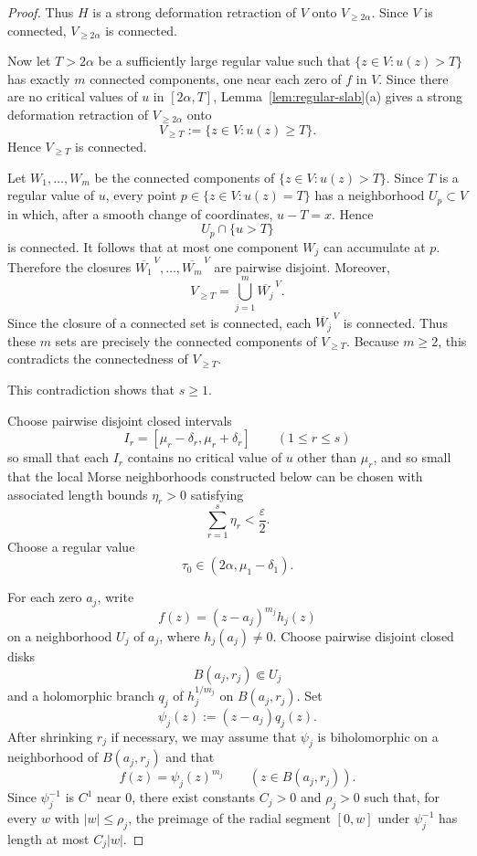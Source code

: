 \documentclass[12pt]{amsart}
\theoremstyle{definition}
\theoremstyle{remark}
\begin{document}
\begin{proof}
Thus $H$ is a strong deformation retraction of $V$ onto $V_{\ge 2\alpha}$. Since $V$ is
connected, $V_{\ge 2\alpha}$ is connected.

Now let $T>2\alpha$ be a sufficiently large regular value such that $\{z\in V:u(z)>T\}$ has exactly $m$ connected components, one near each zero of $f$ in $V$. Since there are no critical values of $u$ in $[2\alpha,T]$, Lemma~\ref{lem:regular-slab}(a) gives a strong deformation retraction of $V_{\ge 2\alpha}$ onto
\[
V_{\ge T}:=\{z\in V:u(z)\ge T\}.
\]
Hence $V_{\ge T}$ is connected.

Let $W_1,\dots,W_m$ be the connected components of $\{z\in V:u(z)>T\}$. Since $T$ is a regular value of $u$, every point $p\in\{z\in V:u(z)=T\}$ has a neighborhood $U_p\subset V$ in which, after a smooth change of coordinates, $u-T=x$. Hence
\[
U_p\cap\{u>T\}
\]
is connected. It follows that at most one component $W_j$ can accumulate at $p$. Therefore the closures $\overline{W_1}^{\,V},\dots,\overline{W_m}^{\,V}$ are pairwise disjoint. Moreover,
\[
V_{\ge T}=\bigcup_{j=1}^m \overline{W_j}^{\,V}.
\]
Since the closure of a connected set is connected, each $\overline{W_j}^{\,V}$ is connected. Thus these $m$ sets are precisely the connected components of $V_{\ge T}$. Because $m\ge2$, this contradicts the connectedness of $V_{\ge T}$.

This contradiction shows that $s\ge1$.

\indent Choose pairwise disjoint closed intervals
\[
 I_r=[\mu_r-\delta_r,\mu_r+\delta_r] \qquad (1\le r\le s)
\]
so small that each $I_r$ contains no critical value of $u$ other than $\mu_r$, and so small that the local Morse neighborhoods constructed below can be chosen with associated length bounds $\eta_r>0$ satisfying
\[
\sum_{r=1}^s \eta_r<\frac{\varepsilon}{2}.
\]
Choose a regular value
\[
 \tau_0\in(2\alpha,\mu_1-\delta_1).
\]

For each zero $a_j$, write
\[
f(z)=(z-a_j)^{m_j}h_j(z)
\]
on a neighborhood $U_j$ of $a_j$, where $h_j(a_j)\neq 0$. Choose pairwise disjoint closed disks
\[
B(a_j,r_j)\Subset U_j
\]
and a holomorphic branch $q_j$ of $h_j^{1/m_j}$ on $B(a_j,r_j)$. Set
\[
\psi_j(z):=(z-a_j)q_j(z).
\]
After shrinking $r_j$ if necessary, we may assume that $\psi_j$ is biholomorphic on a neighborhood of $B(a_j,r_j)$ and that
\[
f(z)=\psi_j(z)^{m_j}
\qquad (z\in B(a_j,r_j)).
\]
Since $\psi_j^{-1}$ is $C^1$ near $0$, there exist constants $C_j>0$ and $\rho_j>0$ such that, for every $w$ with $|w|\le \rho_j$, the preimage of the radial segment $[0,w]$ under $\psi_j^{-1}$ has length at most $C_j|w|$.


\end{proof}
\end{document}
